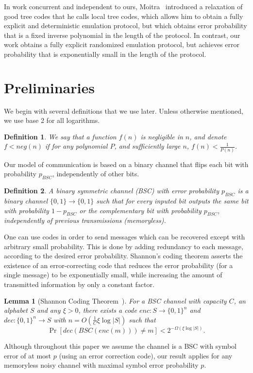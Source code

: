\documentclass[ letterpaper, 11pt]{article}
\newtheorem{definition}{Definition}
\newtheorem{lemma}[theorem]{Lemma}
\begin{document}
In work concurrent and independent to ours, Moitra~\cite{Moitra11}
introduced a relaxation of good tree codes that he calls local tree
codes, which allows him to obtain a fully explicit and deterministic
emulation protocol, but which obtains error probability that is a
fixed inverse polynomial in the length of the protocol.  In
contrast, our work obtains a fully explicit randomized emulation
protocol, but achieves error probability that is exponentially small
in the length of the protocol.





\section{Preliminaries}\label{sec:pre}


We begin with several definitions that we use later.
Unless otherwise mentioned, we use base 2 for all logarithms.
\begin{definition}
We say that a function $f(n)$ is negligible in $n$, and denote $f<neg(n)$
if for any polynomial $P$, and sufficiently large  $n$,
$f(n)< \frac{1}{P(n)}$.
\end{definition}
Our model of communication is based on a binary channel that flips each
bit with probability $p_{BSC}$, independently of other bits.
\begin{definition}
A binary symmetric channel (BSC) with error probability $p_{BSC}$
is a binary channel $\{0,1\}\to\{0,1\}$ such that for every inputed bit
outputs the same bit with probability $1-p_{BSC}$ or the complementary bit
with probability $p_{BSC}$, independently of previous transmissions (memoryless).
\end{definition}

One can use codes in order
to send messages which can be recovered except with arbitrary small probability.
This is done by adding redundancy to each message, according to the desired
error probability.
Shannon's coding theorem asserts the existence of an error-correcting code that reduces the
error probability (for a single message) to be exponentially small,
while increasing the amount of transmitted information
by only a constant factor.

\begin{lemma}[Shannon Coding Theorem~\cite{shannon48}]\label{lem:shannon}
For a BSC channel with capacity $C$, an alphabet $S$ and any $\xi>0$, there exists a code
$enc: S\to \{0,1\}^n$ and $dec: \{0,1\}^n \to S$ with $n=O(\tfrac1C\xi\log|S|)$ such that
\[
\Pr \left [dec ( BSC ( enc(m) ) ) \ne m \right] < 2^{-\Omega(\xi\log |S|)}.
\]
\end{lemma}
\noindent
Although throughout this paper we assume the channel is a BSC with symbol error of at most $p$ (using an error correction code), our result applies for any memoryless noisy channel with maximal symbol error probability $p$.
\end{document}
